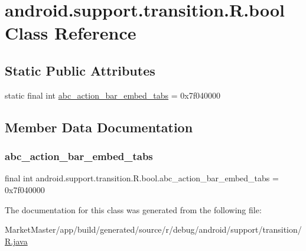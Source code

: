 \hypertarget{classandroid_1_1support_1_1transition_1_1R_1_1bool}{}\section{android.\+support.\+transition.\+R.\+bool Class Reference}
\label{classandroid_1_1support_1_1transition_1_1R_1_1bool}
\subsection*{Static Public Attributes}
\begin{DoxyCompactItemize}
\item 
static final int \mbox{\hyperlink{classandroid_1_1support_1_1transition_1_1R_1_1bool_a84b992ac7b4ad5bd9328f8b255a3b363}{abc\+\_\+action\+\_\+bar\+\_\+embed\+\_\+tabs}} = 0x7f040000
\end{DoxyCompactItemize}


\subsection{Member Data Documentation}
\mbox{\label{classandroid_1_1support_1_1transition_1_1R_1_1bool_a84b992ac7b4ad5bd9328f8b255a3b363}} 
\subsubsection{\texorpdfstring{abc\+\_\+action\+\_\+bar\+\_\+embed\+\_\+tabs}{abc\_action\_bar\_embed\_tabs}}
{\footnotesize\ttfamily final int android.\+support.\+transition.\+R.\+bool.\+abc\+\_\+action\+\_\+bar\+\_\+embed\+\_\+tabs = 0x7f040000\hspace{0.3cm}{\ttfamily [static]}}



The documentation for this class was generated from the following file\+:\begin{DoxyCompactItemize}
\item 
Market\+Master/app/build/generated/source/r/debug/android/support/transition/\mbox{\hyperlink{debug_2android_2support_2transition_2R_8java}{R.\+java}}\end{DoxyCompactItemize}
